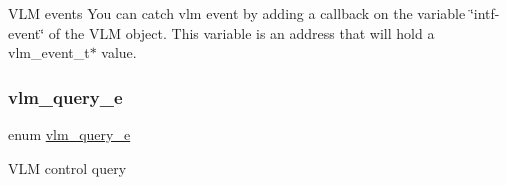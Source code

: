 V\+LM events You can catch vlm event by adding a callback on the variable \char`\"{}intf-\/event\char`\"{} of the V\+LM object. This variable is an address that will hold a vlm\+\_\+event\+\_\+t$\ast$ value. \mbox{\label{group__server_gab547769cc956818fbebbe18a14ac0d98}} 
\subsubsection{\texorpdfstring{vlm\+\_\+query\+\_\+e}{vlm\_query\_e}}
{\footnotesize\ttfamily enum \hyperlink{group__server_gab547769cc956818fbebbe18a14ac0d98}{vlm\+\_\+query\+\_\+e}}

V\+LM control query 